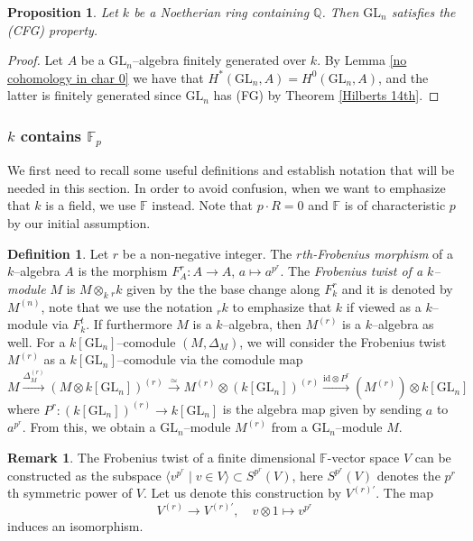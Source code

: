 \documentclass{article}
\theoremstyle{plain}
\newtheorem{Prop}[Th]{Proposition}
\theoremstyle{definition}
\newtheorem{Def}[Th]{Definition}
\newtheorem{Rem}[Th]{Remark}
\newcommand{\GL}{\mathrm{GL}}
\begin{document}
\begin{Prop}\label{CFG for GLn k containing Q}
    Let $k$ be a Noetherian ring containing $\mathbb{Q}$. Then $\GL_n$ satisfies the (CFG) property.
\end{Prop}

\begin{proof}
    Let $A$ be a $\GL_n$--algebra finitely generated over $k$. By Lemma \ref{no cohomology in char 0} we have that $H^\ast(\GL_n,A)=H^0(\GL_n,A)$, and the latter is finitely generated since $\GL_n$ has (FG) by Theorem \ref{Hilberts 14th}. 
\end{proof}

\subsubsection*{$k$ contains $\mathbb{F}_p$}



We first need to recall some useful definitions and establish notation that will be needed in this section. In order to avoid confusion, when we want to emphasize that $k$ is a field, we use $\mathbb{F}$ instead. Note that $p\cdot R=0$ and $\mathbb{F}$ is of characteristic $p$ by our initial assumption. 

\begin{Def}
Let $r$ be a non-negative integer. The \textit{$r$th-Frobenius morphism} of a $k$--algebra $A$ is the morphism  $F^r_A\colon A\to A$, $a\mapsto a^{p^r}$. The \textit{Frobenius twist of a $k$--module $M$} is $M\otimes_k  {}_rk$ given by the the base change along $F^r_k$ and it is denoted by $M^{(n)}$, note that we use the notation ${}_r k$ to emphasize that $k$ if viewed as a $k$--module via $F^t_k$. If furthermore $M$ is a $k$--algebra, then $M^{(r)}$ is a $k$--algebra as well. For a $k[\GL_n]$--comodule $(M,\Delta_M)$, we will consider the Frobenius twist $M^{(r)}$ as a $k[\GL_n]$--comodule via the comodule map
\[
M\xrightarrow[]{\Delta_M^{(r)}} (M\otimes k[\GL_n])^{(r)}\xrightarrow[]{\simeq} M^{(r)}\otimes (k[\GL_n])^{(r)}\xrightarrow[]{\mathrm{id}\otimes P^r} (M^{(r)})\otimes k[\GL_n] 
\]
 where $P^r\colon (k[\GL_n])^{(r)}\to k[\GL_n]$ is the algebra map given by sending $a$ to $a^{p^r}$. From this, we obtain a $\GL_n$--module $M^{(r)}$ from a $\GL_n$--module $M$.
\end{Def}

\begin{Rem}
    The Frobenius twist of a finite dimensional $\mathbb{F}$-vector space $V$ can be constructed as the subspace 
$\langle v^{p^r}\mid v\in V\rangle \subset S^{p^r}(V)$, here $S^{p^r}(V)$ denotes the $p^r$th symmetric power of $V$. Let us denote this construction by $V^{(r)'}$. The map 
\[V^{(r)}\to V^{(r)'}, \quad v\otimes1\mapsto v^{p^r}\]
induces an isomorphism. 
\end{Rem}
\end{document}
